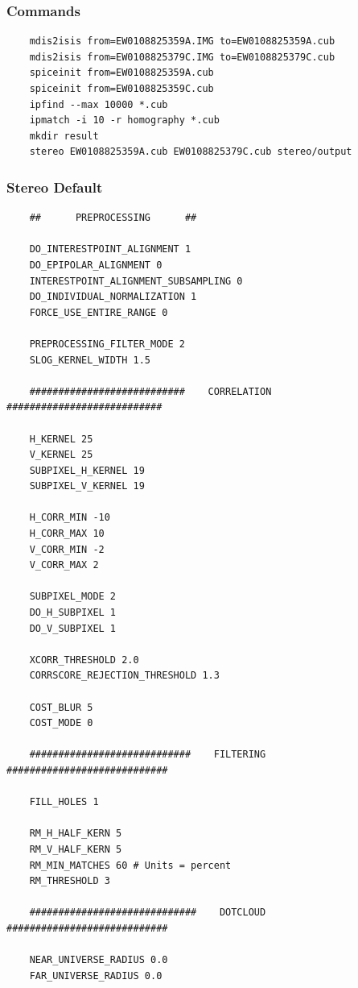 \subsubsection*{Commands}

\begin{verbatim}
    mdis2isis from=EW0108825359A.IMG to=EW0108825359A.cub
    mdis2isis from=EW0108825379C.IMG to=EW0108825379C.cub
    spiceinit from=EW0108825359A.cub
    spiceinit from=EW0108825359C.cub
    ipfind --max 10000 *.cub
    ipmatch -i 10 -r homography *.cub
    mkdir result
    stereo EW0108825359A.cub EW0108825379C.cub stereo/output
\end{verbatim}

\subsubsection*{Stereo Default}

\begin{verbatim}
    ##      PREPROCESSING      ##

    DO_INTERESTPOINT_ALIGNMENT 1
    DO_EPIPOLAR_ALIGNMENT 0
    INTERESTPOINT_ALIGNMENT_SUBSAMPLING 0
    DO_INDIVIDUAL_NORMALIZATION 1
    FORCE_USE_ENTIRE_RANGE 0

    PREPROCESSING_FILTER_MODE 2
    SLOG_KERNEL_WIDTH 1.5

    ###########################    CORRELATION    ###########################

    H_KERNEL 25
    V_KERNEL 25
    SUBPIXEL_H_KERNEL 19
    SUBPIXEL_V_KERNEL 19

    H_CORR_MIN -10
    H_CORR_MAX 10
    V_CORR_MIN -2
    V_CORR_MAX 2

    SUBPIXEL_MODE 2
    DO_H_SUBPIXEL 1
    DO_V_SUBPIXEL 1

    XCORR_THRESHOLD 2.0
    CORRSCORE_REJECTION_THRESHOLD 1.3

    COST_BLUR 5
    COST_MODE 0

    ############################    FILTERING    ############################

    FILL_HOLES 1

    RM_H_HALF_KERN 5
    RM_V_HALF_KERN 5
    RM_MIN_MATCHES 60 # Units = percent
    RM_THRESHOLD 3

    #############################    DOTCLOUD    ############################

    NEAR_UNIVERSE_RADIUS 0.0
    FAR_UNIVERSE_RADIUS 0.0

\end{verbatim}
